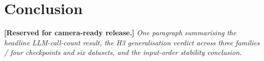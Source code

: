 \section{Conclusion}
\label{sec:conclusion}

\textbf{[Reserved for camera-ready release.]} \textit{One paragraph
summarising the headline LLM-call-count result, the H3 generalisation
verdict across three families / four checkpoints and six datasets, and
the input-order stability conclusion.}
